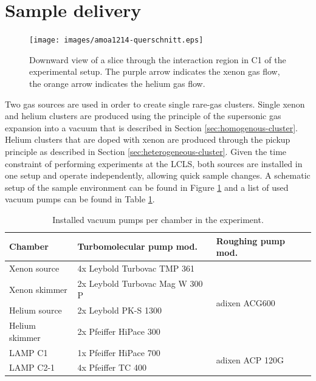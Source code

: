 \section{Sample delivery}\label{sec:sample-delivery}
\begin{figure}
	\centering
		\texttt{[image: images/amoa1214-querschnitt.eps]}
	\caption[Sideview of double sample jet configuration.]{Downward view of a slice through the interaction region in C1 of the experimental setup. The purple arrow indicates the xenon gas flow, the orange arrow indicates the helium gas flow.}
	\label{fig:Overview-Jetalignment}
\end{figure}
Two gas sources are used in order to create single rare-gas clusters. Single xenon and helium clusters are produced using the principle of the supersonic gas expansion into a vacuum that is described in Section \ref{sec:homogenous-cluster}. Helium clusters that are doped with xenon are produced through the pickup principle as described in Section \ref{sec:heterogeneous-cluster}. Given the time constraint of performing experiments at the LCLS, both sources are installed in one setup and operate independently, allowing quick sample changes. A schematic setup of the sample environment can be found in Figure \ref{fig:Overview-Jetalignment} and a list of used vacuum pumps can be found in Table \ref{tab:vacuum-table}.\\[1\baselineskip]
\begin{table}
	\centering
\begin{tabular}{ | l | l | l | }
\hline
	\textbf{Chamber} & \textbf{Turbomolecular pump mod.} & \textbf{Roughing pump mod.} \\ \hline
	Xenon source & 4x Leybold Turbovac TMP 361 & \multirow{4}{*}{adixen ACG600} \\ 
	Xenon skimmer & 2x Leybold Turbovac Mag W 300 P &  \\ 
	Helium source & 2x Leybold PK-S 1300 & \\ 
	Helium skimmer & 2x Pfeiffer HiPace 300 & \\ \hline
	LAMP C1 & 1x Pfeiffer HiPace 700 & \multirow{2}{*}{adixen ACP 120G} \\ 
	LAMP C2-1 & 4x Pfeiffer TC 400 & \\ \hline
\end{tabular}
\caption[Installed vacuum pumps in the experiment.]{Installed vacuum pumps per chamber in the experiment.}
\label{tab:vacuum-table}
\end{table}
